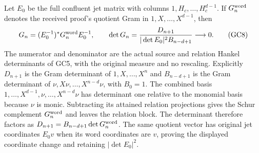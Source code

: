 Let $E_0$ be the full confluent jet matrix with columns
$1,H_c,\ldots,H_c^{d-1}$. If $G_n^{\rm word}$ denotes the
received proof's quotient Gram in $1,X,\ldots,X^{d-1}$, then
\[
 G_n=(E_0^{-1})^*G_n^{\rm word}E_0^{-1},\qquad
 \det G_n=\frac{D_{n+1}}{|\det E_0|^2 B_{n-d+1}}\longrightarrow0.
 \tag{GC8}\label{gc:determinant}
\]
The numerator and denominator are the actual source and relation
Hankel determinants of GC5, with the original measure and no
rescaling. Explicitly $D_{n+1}$ is the Gram determinant of
$1,X,\ldots,X^n$ and $B_{n-d+1}$ is the Gram determinant of
$\nu,X\nu,\ldots,X^{n-d}\nu$, with $B_0=1$.
The combined basis
$1,\ldots,X^{d-1},\nu,\ldots,X^{n-d}\nu$ has determinant one
relative to the monomial basis because $\nu$ is monic.
Subtracting its attained relation projections gives the Schur
complement $G_n^{\rm word}$ and leaves the relation block.
The determinant therefore factors as
$D_{n+1}=B_{n-d+1}\det G_n^{\rm word}$.
The same quotient vector has original jet coordinates $E_0v$
when its word coordinates are $v$, proving the displayed
coordinate change and retaining $|\det E_0|^2$.

